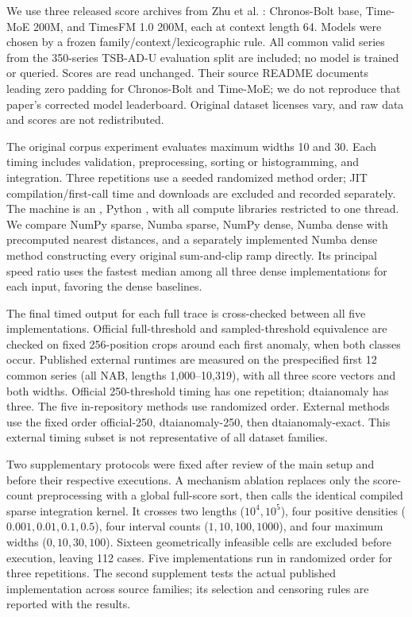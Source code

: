 \documentclass[10pt]{article}
\begin{document}
We use three released score archives from Zhu et al. \cite{zhu2026}: Chronos-Bolt
base, Time-MoE 200M, and TimesFM 1.0 200M, each at context length 64. Models were
chosen by a frozen family/context/lexicographic rule. All common valid series
from the 350-series TSB-AD-U evaluation split \cite{tsbad} are included; no model is trained
or queried. Scores are read unchanged. Their source README documents leading
zero padding for Chronos-Bolt and Time-MoE; we do not reproduce that paper's
corrected model leaderboard. Original dataset licenses vary, and raw data and
scores are not redistributed.

The original corpus experiment evaluates maximum widths 10 and 30. Each timing includes
validation, preprocessing, sorting or histogramming, and integration. Three
repetitions use a seeded randomized method order; JIT compilation/first-call
time and downloads are excluded and recorded separately. The machine is an
\MachineCPU{}, Python \PythonVersion{}, with all compute libraries restricted
to one thread. We compare NumPy sparse, Numba sparse, NumPy dense, Numba dense
with precomputed nearest distances, and a separately implemented Numba dense
method constructing every original sum-and-clip ramp directly. Its principal
speed ratio uses the fastest median among all three dense implementations for
each input, favoring the dense baselines.

The final timed output for each full trace is cross-checked between all five
implementations. Official
full-threshold and sampled-threshold equivalence are checked on fixed
256-position crops around each first anomaly, when both classes occur.
Published external runtimes are measured on the prespecified first 12 common
series (all NAB, lengths 1,000--10,319), with all three score vectors and both
widths. Official 250-threshold timing has one repetition; dtaianomaly has three.
The five in-repository methods use randomized order. External methods use the
fixed order official-250, dtaianomaly-250, then dtaianomaly-exact. This external
timing subset is not representative of all dataset families.

Two supplementary protocols were fixed after review of the main setup and
before their respective executions. A mechanism ablation replaces only the
score-count preprocessing with a global full-score sort, then calls the
identical compiled sparse integration kernel. It crosses two lengths
($10^4,10^5$), four positive densities ($0.001,0.01,0.1,0.5$), four interval
counts ($1,10,100,1000$), and four maximum widths ($0,10,30,100$). Sixteen
geometrically infeasible cells are excluded before execution, leaving 112
cases. Five implementations run in randomized order for three repetitions.
The second supplement tests the actual published implementation across source
families; its selection and censoring rules are reported with the results.
\end{document}
